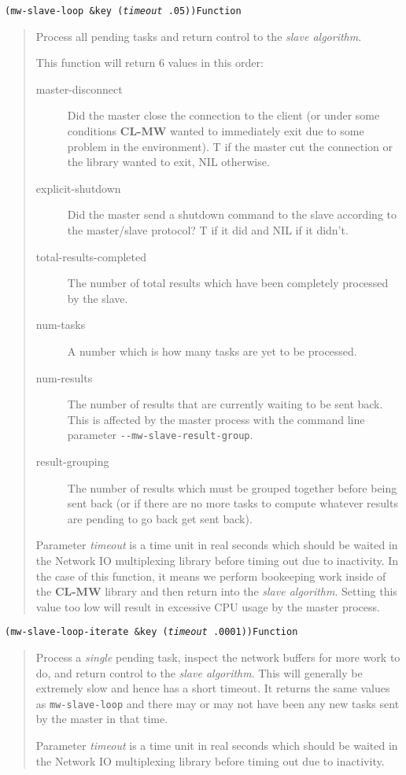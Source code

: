 \documentclass[titlepage,12pt]{book}
\newcommand{\xsmall}{\latexhtml{\small}{}}
\newcommand{\xnormalsize}{\latexhtml{\normalsize}{}}
\newcommand{\clmw}{\xsmall\textbf{CL-MW}\xnormalsize\xspace}
\newcommand{\sa}{\textit{slave algorithm}\xspace}
\newcommand{\dash}{\texttt{-}}
\newcommand{\func}[1]{\xsmall\mbox{\uppercase{\texttt{#1}}}\xnormalsize\xspace}
\newcommand{\Option}[1]{\dash\dash\texttt{#1}}
\newcommand{\apifunc}[2]{\noindent\xsmall\texttt{(#1)}\hspace*{\fill}\xnormalsize\texttt{#2}}
\newenvironment{apientry}[2]
	{\apifunc{#1}{#2}\begin{quotation}}
	{\end{quotation}}
\begin{document}
\begin{apientry}
{mw-slave-loop \&key (\emph{timeout} .05)}
{Function}
Process all pending tasks and return control to the \sa.

This function will return 6 values in this order:
\begin{description}
\item[master-disconnect]
	Did the master close the connection to the client (or under some conditions
	\clmw wanted to immediately exit due to some problem in the environment).
	T if the master cut the connection or the library wanted to exit, NIL
	otherwise.
\item[explicit-shutdown]
	Did the master send a shutdown command to the slave according to the
	master/slave protocol?  T if it did and NIL if it didn't.
\item[total-results-completed]
	The number of total results which have been completely processed by the 
	slave.
\item[num-tasks]
	A number which is how many tasks are yet to be processed.
\item[num-results]
	The number of results that are currently waiting to be sent back. This is 
	affected by the master process with the command line parameter 
	\Option{mw-slave-result-group}.
\item[result-grouping]
	The number of results which must be grouped together before being sent
	back (or if there are no more tasks to compute whatever results are
	pending to go back get sent back).
\end{description}

Parameter \emph{timeout} is a time unit in real seconds which should
be waited in the Network IO multiplexing library before timing out
due to inactivity.  In the case of this function, it means we perform
bookeeping work inside of the \clmw library and then return into
the \sa.  Setting this value too low will result in excessive CPU
usage by the master process.

\end{apientry}

\begin{apientry}
{mw-slave-loop-iterate \&key (\emph{timeout} .0001)}
{Function}
Process a \emph{single} pending task, inspect the network buffers for
more work to do, and return control to the \sa. This will generally
be extremely slow and hence has a short timeout. It returns the same values
as \func{mw-slave-loop} and there may or may not have been any new tasks
sent by the master in that time.

Parameter \emph{timeout} is a time unit in real seconds which should
be waited in the Network IO multiplexing library before timing out
due to inactivity.
\end{apientry}
\end{document}
